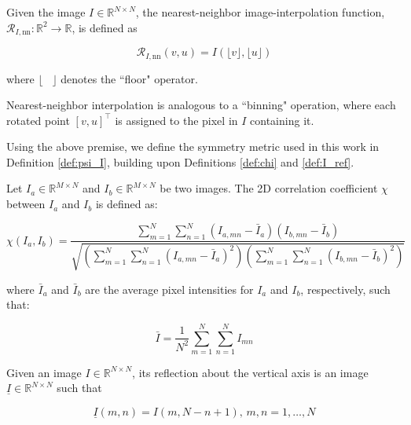 \begin{definition}
    Given the image $I\in\mathbb{R}^{N\times N}$, the nearest-neighbor image-interpolation function, $\mathcal{R}_{I,\mathrm{nn}}:\mathbb{R}^2 \rightarrow \mathbb{R}$, is defined as

    \begin{equation}
        \mathcal{R}_{I,\mathrm{nn}}(v,u) = I(\lfloor v \rfloor, \lfloor u \rfloor )
    \end{equation}

    where $\lfloor \;\;\; \rfloor$ denotes the ``floor" operator.
\end{definition}

Nearest-neighbor interpolation is analogous to a ``binning" operation, where each rotated point $[v,u]^\top$ is assigned to the pixel in $I$ containing it.


Using the above premise, we define the symmetry metric used in this work in Definition \ref{def:psi_I}, building upon Definitions \ref{def:chi} and \ref{def:I_ref}.

\begin{definition}
    \label{def:chi}
    Let $I_a \in \mathbb{R}^{M\times N}$ and $I_b \in \mathbb{R}^{M\times N}$ be two images. The 2D correlation coefficient $\chi$ between $I_a$ and $I_b$ is defined as:

\begin{equation}
\label{eq:chi}
    \chi(I_a,I_b) = \dfrac{\sum_{m=1}^{N}\sum_{n=1}^{N}(I_{a,mn}-\bar{I}_a)(I_{b,mn}-\bar{I}_b) }{\sqrt{\left(\sum_{m=1}^{N}\sum_{n=1}^{N} (I_{a,mn}-\bar{I}_a)^2 \right)\left(\sum_{m=1}^{N}\sum_{n=1}^{N} (I_{b,mn}-\bar{I}_b)^2 \right)}}
\end{equation}

where $\bar{I}_a$ and $\bar{I}_b$ are the average pixel intensities for $I_a$ and $I_b$, respectively, such that:

\begin{equation}
    \bar{I} = \dfrac{1}{N^2} \sum_{m=1}^{N}\sum_{n=1}^{N} I_{mn}
\end{equation}
\end{definition}

\begin{definition}
    \label{def:I_ref}
    Given an image $I \in \mathbb{R}^{N\times N}$, its reflection about the vertical axis is an image $\underline{I}\in\mathbb{R}^{N\times N}$ such that

    \begin{equation}
        \underline{I}(m,n) = I(m,N-n+1),\,m,n=1,\dots,N
    \end{equation}
\end{definition}

